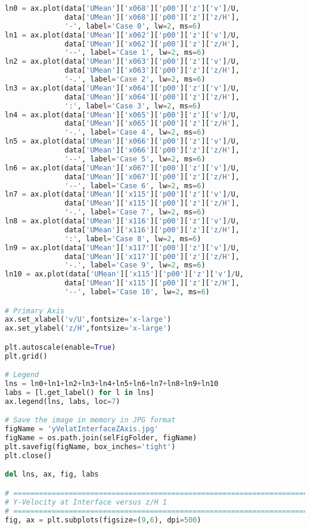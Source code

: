 \begin{lstlisting}[language=python]
ln0 = ax.plot(data['UMean']['x068']['p00']['z']['v']/U,
              data['UMean']['x068']['p00']['z']['z/H'],
              '-', label='Case 0', lw=2, ms=6)
ln1 = ax.plot(data['UMean']['x062']['p00']['z']['v']/U,
              data['UMean']['x062']['p00']['z']['z/H'],
              '--', label='Case 1', lw=2, ms=6)
ln2 = ax.plot(data['UMean']['x063']['p00']['z']['v']/U,
              data['UMean']['x063']['p00']['z']['z/H'],
              '-.', label='Case 2', lw=2, ms=6)
ln3 = ax.plot(data['UMean']['x064']['p00']['z']['v']/U,
              data['UMean']['x064']['p00']['z']['z/H'],
              ':', label='Case 3', lw=2, ms=6)
ln4 = ax.plot(data['UMean']['x065']['p00']['z']['v']/U,
              data['UMean']['x065']['p00']['z']['z/H'],
              '-.', label='Case 4', lw=2, ms=6)
ln5 = ax.plot(data['UMean']['x066']['p00']['z']['v']/U,
              data['UMean']['x066']['p00']['z']['z/H'],
              '--', label='Case 5', lw=2, ms=6)
ln6 = ax.plot(data['UMean']['x067']['p00']['z']['v']/U,
              data['UMean']['x067']['p00']['z']['z/H'],
              '--', label='Case 6', lw=2, ms=6)
ln7 = ax.plot(data['UMean']['x115']['p00']['z']['v']/U,
              data['UMean']['x115']['p00']['z']['z/H'],
              '-.', label='Case 7', lw=2, ms=6)
ln8 = ax.plot(data['UMean']['x116']['p00']['z']['v']/U,
              data['UMean']['x116']['p00']['z']['z/H'],
              ':', label='Case 8', lw=2, ms=6)
ln9 = ax.plot(data['UMean']['x117']['p00']['z']['v']/U,
              data['UMean']['x117']['p00']['z']['z/H'],
              '-.', label='Case 9', lw=2, ms=6)
ln10 = ax.plot(data['UMean']['x115']['p00']['z']['v']/U,
              data['UMean']['x115']['p00']['z']['z/H'],
              '--', label='Case 10', lw=2, ms=6)

# Primary Axis
ax.set_xlabel('v/U',fontsize='x-large')
ax.set_ylabel('z/H',fontsize='x-large')

plt.autoscale(enable=True)
plt.grid()

# Legend
lns = ln0+ln1+ln2+ln3+ln4+ln5+ln6+ln7+ln8+ln9+ln10
labs = [l.get_label() for l in lns]
ax.legend(lns, labs, loc=7)

# Save the image in memory in JPG format
figName = 'yVelatInterfaceZAxis.jpg'
figName = os.path.join(selFigFolder, figName)
plt.savefig(figName, box_inches='tight')
plt.close()

del lns, ax, fig, labs

# =============================================================================
# Y-Velocity at Interface versus z/H 1
# =============================================================================
fig, ax = plt.subplots(figsize=(9,6), dpi=500)


\end{lstlisting}
